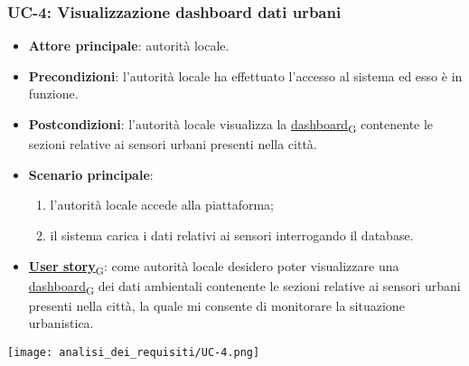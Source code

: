 \newpage
\subsubsection{UC-4: Visualizzazione dashboard dati urbani}
\begin{itemize}
	\item \textbf{Attore principale}: autorità locale.
	\item \textbf{Precondizioni}: l'autorità locale ha effettuato l'accesso al sistema ed esso è in funzione.
	\item \textbf{Postcondizioni}: l'autorità locale visualizza la \href{https://7last.github.io/docs/pb/documentazione-interna/glossario\#dashboard}{dashboard\textsubscript{G}} contenente le sezioni relative ai sensori urbani presenti nella città.
	\item \textbf{Scenario principale}:
	      \begin{enumerate}
		      \item l'autorità locale accede alla piattaforma;
		      \item il sistema carica i dati relativi ai sensori interrogando il database.
	      \end{enumerate}
	\item \href{https://7last.github.io/docs/pb/documentazione-interna/glossario\#user-story}{\textbf{User story}\textsubscript{G}}: come autorità locale desidero poter visualizzare una \href{https://7last.github.io/docs/pb/documentazione-interna/glossario\#dashboard}{dashboard\textsubscript{G}} dei dati ambientali contenente le sezioni relative ai sensori urbani presenti nella città, la quale mi consente di monitorare la situazione urbanistica.
\end{itemize}
\begin{center}
	\texttt{[image: analisi\_dei\_requisiti/UC-4.png]}
\end{center}

